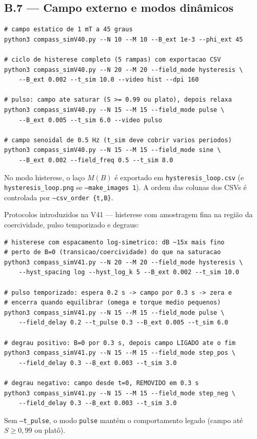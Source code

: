 \documentclass[11pt,a4paper]{article}
\newcommand{\code}[1]{\texttt{#1}}
\begin{document}
\subsection*{B.7 --- Campo externo e modos dinâmicos}

\begin{verbatim}
# campo estatico de 1 mT a 45 graus
python3 compass_simV40.py --N 10 --M 10 --B_ext 1e-3 --phi_ext 45

# ciclo de histerese completo (5 rampas) com exportacao CSV
python3 compass_simV40.py --N 20 --M 20 --field_mode hysteresis \
    --B_ext 0.002 --t_sim 10.0 --video hist --dpi 160

# pulso: campo ate saturar (S >= 0.99 ou plato), depois relaxa
python3 compass_simV40.py --N 15 --M 15 --field_mode pulse \
    --B_ext 0.005 --t_sim 6.0 --video pulso

# campo senoidal de 0.5 Hz (t_sim deve cobrir varios periodos)
python3 compass_simV40.py --N 15 --M 15 --field_mode sine \
    --B_ext 0.002 --field_freq 0.5 --t_sim 8.0
\end{verbatim}
No modo histerese, o laço $M(B)$ é exportado em
\code{hysteresis\_loop.csv} (e \code{hysteresis\_loop.png} se
\code{--make\_images 1}). A ordem das colunas dos CSVs é controlada por
\code{--csv\_order \{t,B\}}.

\medskip\noindent
Protocolos introduzidos na V41 --- histerese com amostragem fina na
região da coercividade, pulso temporizado e degraus:
\begin{verbatim}
# histerese com espacamento log-simetrico: dB ~15x mais fino
# perto de B=0 (transicao/coercividade) do que na saturacao
python3 compass_simV41.py --N 20 --M 20 --field_mode hysteresis \
    --hyst_spacing log --hyst_log_k 5 --B_ext 0.002 --t_sim 10.0

# pulso temporizado: espera 0.2 s -> campo por 0.3 s -> zera e
# encerra quando equilibrar (omega e torque medio pequenos)
python3 compass_simV41.py --N 15 --M 15 --field_mode pulse \
    --field_delay 0.2 --t_pulse 0.3 --B_ext 0.005 --t_sim 6.0

# degrau positivo: B=0 por 0.3 s, depois campo LIGADO ate o fim
python3 compass_simV41.py --N 15 --M 15 --field_mode step_pos \
    --field_delay 0.3 --B_ext 0.003 --t_sim 3.0

# degrau negativo: campo desde t=0, REMOVIDO em 0.3 s
python3 compass_simV41.py --N 15 --M 15 --field_mode step_neg \
    --field_delay 0.3 --B_ext 0.003 --t_sim 3.0
\end{verbatim}
Sem \code{--t\_pulse}, o modo \code{pulse} mantém o comportamento
legado (campo até $S \geq 0{,}99$ ou platô).
\end{document}
